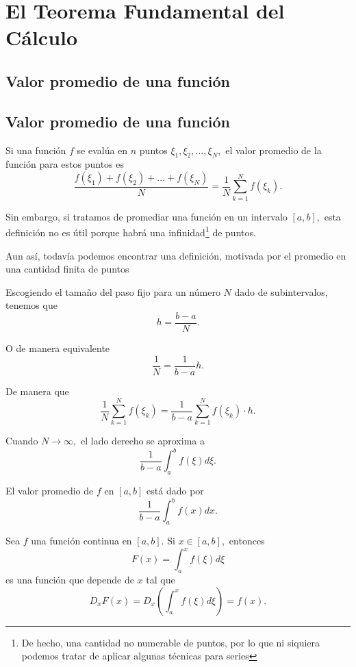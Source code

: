 \section{El Teorema Fundamental del Cálculo}

\subsection{Valor promedio de una función}


 \subsection{Valor promedio de una función}
 Si una función $f$ se evalúa en $n$ puntos $\xi_{1}, \xi_{2},...,\xi_{N},$ el valor promedio de la función para estos puntos es
 $$
 \dfrac{f(\xi_{1})+f(\xi_{2})+...+f(\xi_{N})}{N}=\dfrac{1}{N}\sum_{k=1}^{N}f(\xi_{k}).
 $$



 Sin embargo, si tratamos de promediar una función en un intervalo $[a,b],$ esta definición no es útil porque habrá una infinidad\footnote{De hecho, una cantidad no numerable de puntos, por lo que ni siquiera podemos tratar de aplicar algunas técnicas para series} de puntos.


 Aun así, todavía podemos encontrar una definición, motivada por el promedio en una cantidad finita de puntos



 Escogiendo el tamaño del paso fijo para un número $N$ dado de subintervalos, tenemos que
 $$
 h=\dfrac{b-a}{N}.
 $$


 O de manera equivalente
 $$
 \dfrac{1}{N}=\dfrac{1}{b-a}h.
 $$




 De manera que
 $$
 \dfrac{1}{N}\sum_{k=1}^{N}f(\xi_{k})=\dfrac{1}{b-a}\sum_{k=1}^{N}f(\xi_{k}) \cdot h.
 $$

 Cuando $N\to \infty,$ el lado derecho se aproxima a
 $$
 \dfrac{1}{b-a} \int_{a}^{b} f(\xi)d\xi.
 $$



 \begin{definicion}
  El valor promedio de $f$ en $[a,b]$ está dado por
  $$
  \dfrac{1}{b-a} \int_{a}^{b} f(x)dx.
  $$
 \end{definicion}




 Sea $f$ una función continua en $[a,b].$ Si $x\in[a,b],$ entonces $$F(x)=\int_{a}^{x}f(\xi)d\xi$$ es una función que depende de $x$ tal que
 \[
  \label{ayr:24.2}
  D_{x}F(x)=D_{x}\left( \int_{a}^{x}f(\xi)d\xi \right)=f(x).
 \]



